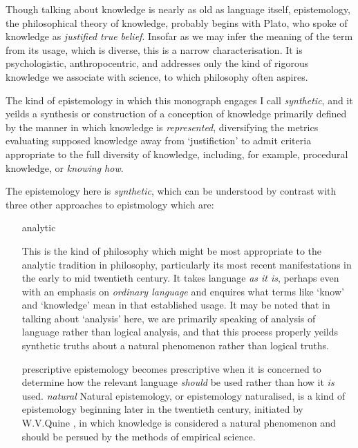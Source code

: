 Though talking about knowledge is nearly as old as language itself, epistemology, the philosophical theory of knowledge, probably begins with Plato, who spoke of knowledge as \emph{justified true belief}.
Insofar as we may infer the meaning of the term from its usage, which is diverse, this is a narrow characterisation.
It is psychologistic, anthropocentric, and addresses only the kind of rigorous knowledge we associate with science, to which philosophy often aspires.

The kind of epistemology in which this monograph engages I call \emph{synthetic}, and it yeilds a synthesis or construction of a conception of knowledge primarily defined by the manner in which knowledge is \emph{represented}, diversifying the metrics evaluating supposed knowledge away from `justifiction' to admit criteria appropriate to the full diversity of knowledge, including, for example, procedural  knowledge, or \emph{knowing how}.

The epistemology here is \emph{synthetic}, which can be understood by contrast with three other approaches to epistmology which are:
\begin{itemize}
\item[analytic]

  This is the kind of philosophy which might be most appropriate to the analytic tradition in philosophy, particularly its most recent manifestations in the early to mid twentieth century.
  It takes language \emph{as it is}, perhaps even with an emphasis on \emph{ordinary language} and enquires what terms like `know' and `knowledge' mean in that established usage.
  It may be noted that in talking about `analysis' here, we are primarily speaking of analysis of language rather than logical analysis, and that this process properly yeilds synthetic truths about a natural phenomenon rather than logical truths.
\item[prescriptive]
  epistemology becomes prescriptive when it is concerned to determine how the relevant language \emph{should} be used rather than how it \emph{is} used.
  \emph{natural}
  Natural epistemology, or epistemology naturalised, is a kind of epistemology beginning later in the twentieth century, initiated by W.V.Quine \cite{quine1969epistemology}, in which knowledge is considered a natural phenomenon and should be persued by the methods of empirical science.
\end{itemize}
